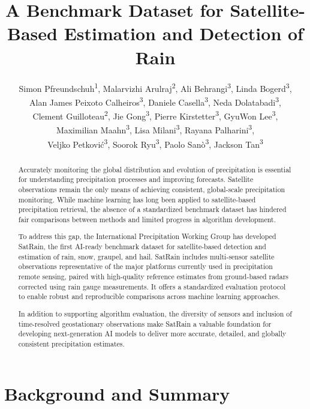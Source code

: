 \documentclass[11pt]{article}
\title{A Benchmark Dataset for Satellite-Based Estimation and Detection of Rain}
\author{%
	Simon Pfreundschuh\textsuperscript{1}, %
	Malarvizhi Arulraj\textsuperscript{2}, %
	Ali Behrangi\textsuperscript{3}, %
	Linda Bogerd\textsuperscript{3}, \\
	Alan James Peixoto Calheiros\textsuperscript{3}, %
	Daniele Casella\textsuperscript{3}, %
	Neda Dolatabadi\textsuperscript{3}, \\ %
	Clement Guilloteau\textsuperscript{2}, %
	Jie Gong\textsuperscript{3}, %
	Pierre Kirstetter\textsuperscript{3}, %
	GyuWon Lee\textsuperscript{3}, \\ %
	Maximilian Maahn\textsuperscript{3}, %
	Lisa Milani\textsuperscript{3}, %
	Rayana Palharini\textsuperscript{3},\\%
	Veljko Petković\textsuperscript{3}, %
	Soorok Ryu\textsuperscript{3}, %
	Paolo Sanò\textsuperscript{3}, %
	Jackson Tan\textsuperscript{3}\\
}
\date{
  \begin{flushleft}
	\footnotesize
	\textsuperscript{1} Department of Atmospheric Science, Colorado State University \\
	\textsuperscript{2} Department of Civil and Environmental Engineering, University of California Irvine \\
	\textsuperscript{3} Department of Hydrology and Atmospheric Sciences, University of Arizona\\
	\textsuperscript{2} Department of Mathematics, University B, City, Country \\
	\textsuperscript{3} Department of Atmospheric Science, Colorado State University \\
	\textsuperscript{4} Instituto Nacional de Pesquisas Espaciais \\
	\textsuperscript{5} Department of Atmospheric Sciences, Kyungpook National University \\
	\textsuperscript{5} Department of Atmospheric Sciences, Kyungpook National University \\
	\textsuperscript{6} NASA Goddard Space Flight Center \\
	\textsuperscript{7} University of Maryland, Baltimore County \\
	\textsuperscript{7} University of Maryland\\
	\textsuperscript{8} Institute for Meteorology, University of Leipzig \\
	\textsuperscript{9} Institute of Atmospheric Sciences and Climate, Italian National Research Council \\
	\textsuperscript{10} Earth System Science Interdisciplinary Center, University of Maryland  \\
	\textsuperscript{10} Cooperative Institute for Satellite Earth System Studies, University of Maryland  \\
	\end{flushleft}
}
\begin{document}
\maketitle


\begin{abstract}

Accurately monitoring the global distribution and evolution of precipitation is
essential for understanding precipitation processes and improving forecasts.
Satellite observations remain the only means of achieving consistent,
global-scale precipitation monitoring. While machine learning has long been
applied to satellite-based precipitation retrieval, the absence of a
standardized benchmark dataset has hindered fair comparisons between methods and
limited progress in algorithm development.

To address this gap, the International Precipitation Working Group has developed
SatRain, the first AI-ready benchmark dataset for satellite-based detection and
estimation of rain, snow, graupel, and hail. SatRain includes multi-sensor
satellite observations representative of the major platforms currently used in
precipitation remote sensing, paired with high-quality reference estimates from
ground-based radars corrected using rain gauge measurements. It offers a
standardized evaluation protocol to enable robust and reproducible comparisons
across machine learning approaches.

In addition to supporting algorithm evaluation, the diversity of
sensors and inclusion of time-resolved geostationary observations make SatRain a
valuable foundation for developing next-generation AI models to deliver more
accurate, detailed, and globally consistent precipitation estimates.

\end{abstract}

\section{Background and Summary}
\end{document}
